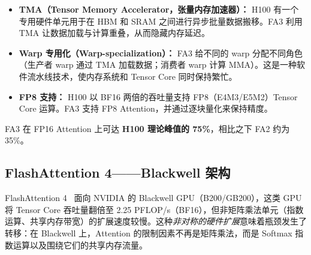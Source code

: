 \begin{itemize}
  \item \textbf{TMA（Tensor Memory Accelerator，张量内存加速器）：} H100 有一个专用硬件单元用于在 HBM 和 SRAM 之间进行异步批量数据搬移。FA3 利用 TMA 让数据加载与计算重叠，从而隐藏内存延迟。
  \item \textbf{Warp 专用化（Warp-specialization）：} FA3 给不同的 warp 分配不同角色（生产者 warp 通过 TMA 加载数据；消费者 warp 计算 MMA）。这是一种软件流水线技术，使内存系统和 Tensor Core 同时保持繁忙。
  \item \textbf{FP8 支持：} H100 以 BF16 两倍的吞吐量支持 FP8（E4M3/E5M2）Tensor Core 运算。FA3 支持 FP8 Attention，并通过逐块量化来保持精度。
\end{itemize}

FA3 在 FP16 Attention 上可达 \textbf{H100 理论峰值的 75\%}，相比之下 FA2 约为 35\%。

\subsection{FlashAttention 4——Blackwell 架构}
\label{flash-attention-4-blackwell-architecture}

FlashAttention 4~\cite{zadouri2026flashattention4} 面向 NVIDIA 的 Blackwell GPU（B200/GB200），这类 GPU 将 Tensor Core 吞吐量翻倍至 2.25 PFLOP/s（BF16），但非矩阵乘法单元（指数运算、共享内存带宽）的扩展速度较慢。这种\emph{非对称的硬件扩展}意味着瓶颈发生了转移：在 Blackwell 上，Attention 的限制因素不再是矩阵乘法，而是 Softmax 指数运算以及围绕它们的共享内存流量。


